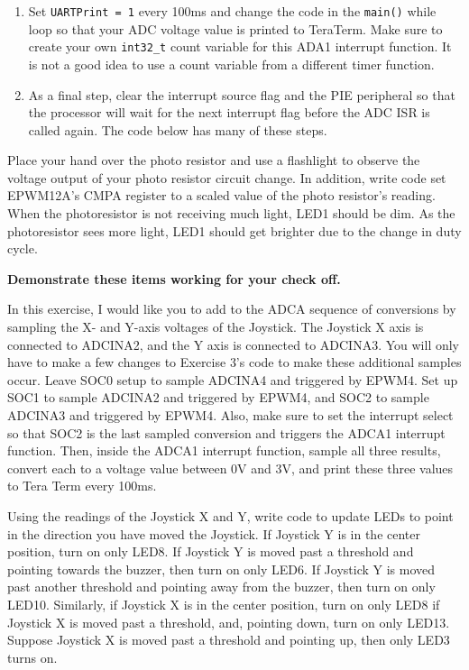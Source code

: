 \documentclass[11pt]{article}
\begin{document}
\begin{enumerate}
        \item Set \texttt{UARTPrint = 1} every 100ms and change the code in the \texttt{main()} while loop so that your ADC voltage value is printed to TeraTerm. Make sure to create your own \texttt{int32_t} count variable for this ADA1 interrupt function. It is not a good idea to use a count variable from a different timer function.
    \item As a final step, clear the interrupt source flag and the PIE peripheral so that the processor will wait for the next interrupt flag before the ADC ISR is called again. The code below has many of these steps.
\end{enumerate}
%
Place your hand over the photo resistor and use a flashlight to observe the voltage output of your photo resistor circuit change. In addition, write code set EPWM12A’s CMPA register to a scaled value of the photo resistor’s reading. When the photoresistor is not receiving much light, LED1 should be dim. As the photoresistor sees more light, LED1 should get brighter due to the change in duty cycle.

\textbf{Demonstrate these items working for your check off.}


In this exercise, I would like you to add to the ADCA sequence of conversions by sampling the X- and Y-axis voltages of the Joystick. The Joystick X axis is connected to ADCINA2, and the Y axis is connected to ADCINA3. You will only have to make a few changes to Exercise 3’s code to make these additional samples occur. Leave SOC0 setup to sample ADCINA4 and triggered by EPWM4. Set up SOC1 to sample ADCINA2 and triggered by EPWM4, and SOC2 to sample ADCINA3 and triggered by EPWM4. Also, make sure to set the interrupt select so that SOC2 is the last sampled conversion and triggers the ADCA1 interrupt function. Then, inside the ADCA1 interrupt function, sample all three results, convert each to a voltage value between 0V and 3V, and print these three values to Tera Term every 100ms.

Using the readings of the Joystick X and Y, write code to update LEDs to point in the direction you have moved the Joystick. If Joystick Y is in the center position, turn on only LED8. If Joystick Y is moved past a threshold and pointing towards the buzzer, then turn on only LED6. If Joystick Y is moved past another threshold and pointing away from the buzzer, then turn on only LED10. Similarly, if Joystick X is in the center position, turn on only LED8 if Joystick X is moved past a threshold, and, pointing down, turn on only LED13. Suppose Joystick X is moved past a threshold and pointing up, then only LED3 turns on.
\end{document}
